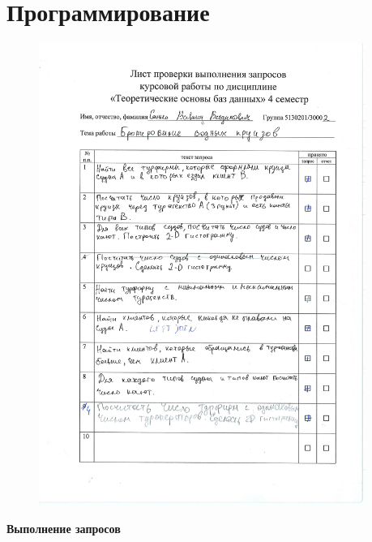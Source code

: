 \documentclass[11pt,a4paper,final]{article}
\begin{document}
\newpage
\section{Программирование}
\begin{figure}[h!]
    \centering
    \includegraphics[width=0.95\textwidth]{42.jpg} 
\end{figure}


\newpage
\Large\textbf{{Выполнение запросов}}
\end{document}
